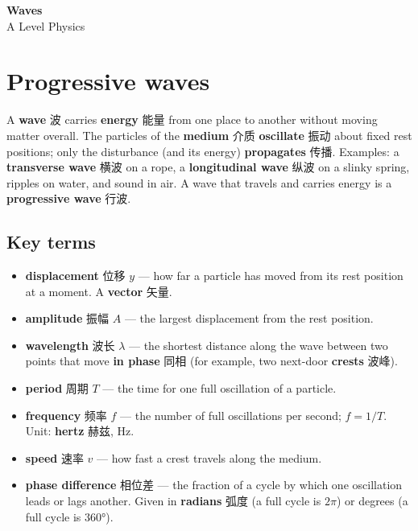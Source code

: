 \documentclass[11pt]{article}
\begin{document}
\begin{center}
  {\LARGE\bfseries Waves}\\[0.35em]
  {\large A Level Physics}
\end{center}
\vspace{0.6em}

\section*{Progressive waves}

A \textbf{wave} 波 carries \textbf{energy} 能量 from one place to another without moving matter overall. The particles of the \textbf{medium} 介质 \textbf{oscillate} 振动 about fixed rest positions; only the disturbance (and its energy) \textbf{propagates} 传播. Examples: a \textbf{transverse wave} 横波 on a rope, a \textbf{longitudinal wave} 纵波 on a slinky spring, ripples on water, and sound in air. A wave that travels and carries energy is a \textbf{progressive wave} 行波.

\subsection*{Key terms}

\begin{itemize}
\item \textbf{displacement} 位移 $y$ — how far a particle has moved from its rest position at a moment. A \textbf{vector} 矢量.

\item \textbf{amplitude} 振幅 $A$ — the largest displacement from the rest position.

\item \textbf{wavelength} 波长 $\lambda$ — the shortest distance along the wave between two points that move \textbf{in phase} 同相 (for example, two next-door \textbf{crests} 波峰).

\item \textbf{period} 周期 $T$ — the time for one full oscillation of a particle.

\item \textbf{frequency} 频率 $f$ — the number of full oscillations per second; $f = 1/T$. Unit: \textbf{hertz} 赫兹, $\text{Hz}$.

\item \textbf{speed} 速率 $v$ — how fast a crest travels along the medium.

\item \textbf{phase difference} 相位差 — the fraction of a cycle by which one oscillation leads or lags another. Given in \textbf{radians} 弧度 (a full cycle is $2\pi$) or degrees (a full cycle is $360°$).

\end{itemize}
\end{document}
